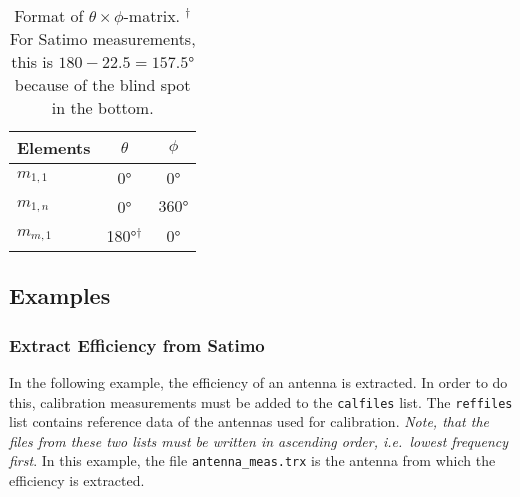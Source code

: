 \begin{table}[htbp]
    \centering
    \begin{tabular}{|l|c|c|}
        \hline
        Elements & $\theta$ & $\phi$ \\
        \hline
        $m_{1,1}$ & \ang{0} & \ang{0} \\
        $m_{1,n}$ & \ang{0} & $\ang{360}$ \\
        $m_{m,1}$ & \ang{180}$^{\dagger}$ & \ang{0} \\
        \hline
    \end{tabular}
    \caption{Format of $\theta\times\phi$-matrix. $^{\dagger}$For Satimo measurements, this is $180-22.5=\ang{157.5}$ because of the blind spot in the bottom.}
    \label{tab:matrixformat}
\end{table}

\subsection{Examples}

\subsubsection{Extract Efficiency from Satimo}
In the following example, the efficiency of an antenna is extracted. In order to do this, calibration measurements must be added to the \texttt{calfiles} list. The \texttt{reffiles} list contains reference data of the antennas used for calibration. \emph{Note, that the files from these two lists must be written in ascending order, i.e.\ lowest frequency first}. In this example, the file \texttt{antenna\_meas.trx} is the antenna from which the efficiency is extracted.
